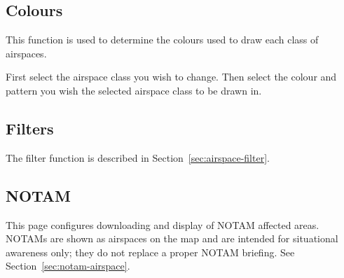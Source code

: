 \subsection*{Colours}
This function is used to determine the colours used to draw each class of
airspaces.

First select the airspace class you wish to change. Then select the colour and 
pattern you wish the selected airspace class to be drawn in.

\subsection*{Filters}
The filter function is described in Section~\ref{sec:airspace-filter}.

\subsection*{NOTAM}

This page configures downloading and display of NOTAM affected areas.
NOTAMs are shown as airspaces on the map and are intended for
situational awareness only; they do not replace a proper NOTAM briefing.
See Section~\ref{sec:notam-airspace}.

